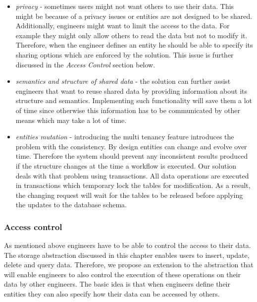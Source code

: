 \begin{itemize}

	\item \textit{privacy} - sometimes users might not want others to use their data. This might be because of a privacy issues or entities are not designed to be shared. Additionally, engineers might want to limit the access to the data. For example they might only allow others to read the data but not to modify it. Therefore, when the engineer defines an entity he should be able to specify its sharing options which are enforced by the solution. This issue is further discussed in the \textit{Access Control} section below.
	 
	\item \textit{semantics and structure of shared data} - the solution can further assist engineers that want to reuse shared data by providing information about its structure and semantics. Implementing such functionality will save them a lot of time since otherwise this information has to be communicated by other means which may take a lot of time.
	
	\item \textit{entities mutation} - introducing the multi tenancy feature introduces the problem with the consistency. By design entities can change and evolve over time. Therefore the system should prevent any inconsistent results produced if the structure changes at the time a workflow is executed. Our solution deals with that problem using transactions. All data operations are executed in transactions which temporary lock the tables for modification. As a result, the changing request will wait for the tables to be released before applying the updates to the database schema.
\end{itemize}


\subsubsection{Access control}

As mentioned above engineers have to be able to control the access to their data. The storage abstraction discussed in this chapter enables users to insert, update, delete and query data. Therefore, we propose an extension to the abstraction that will enable engineers to also control the execution of these operations on their data by other engineers. The basic idea is that when engineers define their entities they can also specify how their data can be accessed by others.

